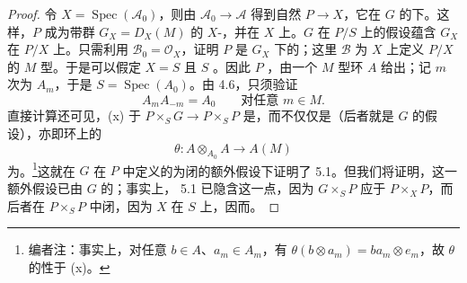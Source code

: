 \begin{proof}
令 $X=\operatorname{Spec}(\mathcal A_0)$，则由 $\mathcal A_0\to\mathcal A$ 得到自然 $P\to X$，它在 $G$ 的下。这样，$P$ 成为带群 $G_X=D_X(M)$ 的 $X$-，并在 $X$ 上。$G$ 在 $P/S$ 上的假设蕴含 $G_X$ 在 $P/X$ 上。只需利用 $\mathcal B_0=\mathcal O_X$，证明 $P$ 是 $G_X$ 下的；这里 $\mathcal B$ 为 $X$ 上定义 $P/X$ 的 $M$ 型。于是可以假定 $X=S$ 且 $S$ 。因此 $P$ ，由一个 $M$ 型环 $A$ 给出；记 $m$ 次为 $A_m$，于是 $S=\operatorname{Spec}(A_0)$。由 4.6，只须验证
\[
A_mA_{-m}=A_0\qquad\text{对任意 }m\in M.\tag{x}
\]
直接计算还可见，(x) 于 $P\times_SG\to P\times_SP$ 是，而不仅仅是（后者就是 $G$ 的假设），亦即环上的
\[
\theta:A\otimes_{A_0}A\longrightarrow A(M)
\]
为。\footnote[18]{编者注：事实上，对任意 $b\in A$、$a_m\in A_m$，有 $\theta(b\otimes a_m)=ba_m\otimes e_m$，故 $\theta$ 的性于 (x)。}这就在 $G$ 在 $P$ 中定义的为闭的额外假设下证明了 5.1。但我们将证明，这一额外假设已由 $G$ 的；事实上， 5.1 已隐含这一点，因为 $G\times_SP$ 应于 $P\times_XP$，而后者在 $P\times_SP$ 中闭，因为 $X$ 在 $S$ 上，因而。


\end{proof}
